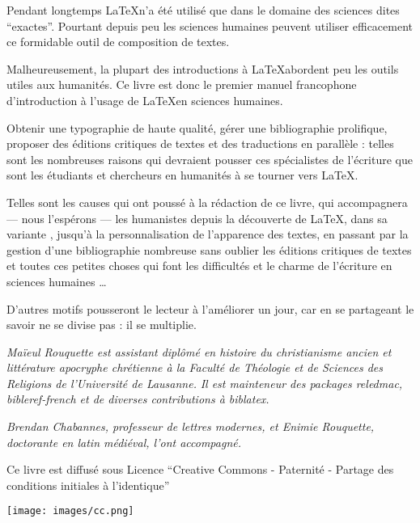 \thispagestyle{empty}

Pendant longtemps \LaTeX n'a été utilisé que dans le domaine des sciences dites \enquote{exactes}.
Pourtant depuis peu les sciences humaines peuvent utiliser efficacement ce formidable outil de composition de textes.


Malheureusement, la plupart des introductions à \LaTeX abordent peu les outils utiles aux humanités. Ce livre est donc le premier manuel francophone d'introduction à l'usage de \LaTeX en sciences humaines.

Obtenir une typographie de haute qualité, gérer une bibliographie prolifique, proposer des éditions critiques de textes et des traductions en parallèle : telles sont les nombreuses raisons qui devraient pousser ces spécialistes de l'écriture que sont les étudiants et chercheurs en humanités à se tourner vers \LaTeX.

Telles sont les causes qui ont poussé à la rédaction de ce livre, qui accompagnera --- nous l'espérons --- les humanistes depuis la découverte de \LaTeX, dans sa variante \XeLaTeX, jusqu'à la personnalisation de l'apparence des textes, en passant par la gestion d'une bibliographie nombreuse sans oublier les éditions critiques de textes et toutes ces petites choses qui font les difficultés et le charme de l'écriture en sciences humaines \ldots

D'autres motifs pousseront le lecteur à l'améliorer un jour, car en se partageant le savoir ne se divise pas : il se multiplie.

\vspace{4ex}

\scriptsize
\emph{
Maïeul Rouquette est assistant diplômé en histoire du christianisme ancien et littérature apocryphe chrétienne à la Faculté de Théologie et de Sciences des Religions de l'Université de Lausanne.} 
\emph{Il est mainteneur des packages \emph{reledmac}, \emph{bibleref-french} et de diverses contributions à \emph{biblatex}.}


\emph{Brendan Chabannes, professeur de lettres modernes, et Enimie Rouquette, doctorante en latin médiéval, l'ont accompagné.}

\normalsize

\vspace{4ex}
Ce livre est diffusé sous Licence \enquote{Creative Commons - Paternité - Partage des conditions initiales à l'identique}

\vspace{2ex}
 \raggedleft\texttt{[image: images/cc.png]}
